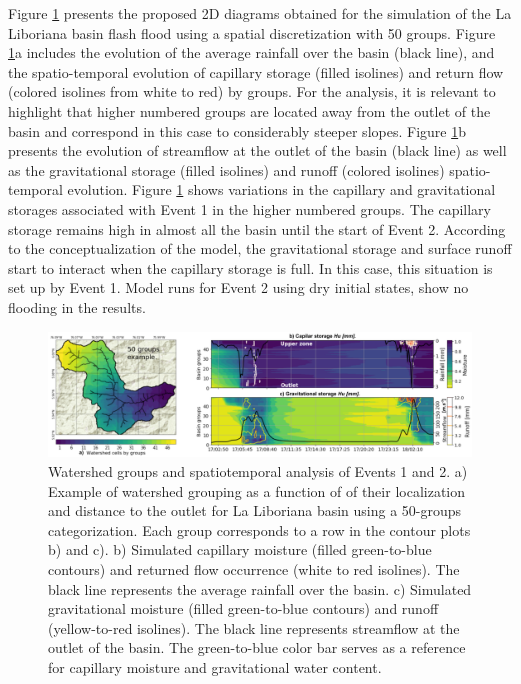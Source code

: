 \documentclass[hess, manuscript]{copernicus}
\begin{document}
Figure \ref{fig:HumedadSpatioTemporal} presents the proposed 2D diagrams obtained for the simulation of the La Liboriana basin flash flood using a spatial discretization with 50 groups. Figure \ref{fig:HumedadSpatioTemporal}a includes the evolution of the average rainfall over the basin (black line), and the spatio-temporal evolution of capillary storage (filled isolines) and return flow (colored isolines from white to red) by groups. For the analysis, it is relevant to highlight that higher numbered groups are located away from the outlet of the basin and correspond in this case to considerably steeper slopes. Figure \ref{fig:HumedadSpatioTemporal}b presents the evolution of streamflow at the outlet of the basin (black line) as well as the gravitational storage (filled isolines) and runoff (colored isolines) spatio-temporal evolution.  Figure \ref{fig:HumedadSpatioTemporal} shows  variations in the capillary and gravitational storages associated with Event 1 in the higher numbered groups.  The capillary storage remains high in almost all the basin until the start of Event 2.  According to the conceptualization of the model, the gravitational storage and surface runoff start to interact when the capillary storage is full. In this case, this situation is set up by Event 1.  Model runs for Event 2 using dry initial states, show no flooding in the results.\\

\begin{figure}[t!]
\centering
 \includegraphics[width=16cm]{Figures/Figure_9_10.png}
 \caption{Watershed groups and spatiotemporal analysis of Events 1 and 2.  a) Example of watershed grouping as a function of of their localization and distance to the outlet for La Liboriana basin using a 50-groups categorization. Each group corresponds to a row in the contour plots b) and c). b) Simulated capillary moisture (filled green-to-blue contours) and returned flow occurrence (white to red isolines).  The black line represents the average rainfall over the basin. c) Simulated gravitational moisture (filled green-to-blue contours) and runoff (yellow-to-red isolines).  The black line represents streamflow at the outlet of the basin.  The green-to-blue color bar serves as a reference for capillary moisture and gravitational water content.}
    \label{fig:HumedadSpatioTemporal}
\end{figure}
\end{document}
